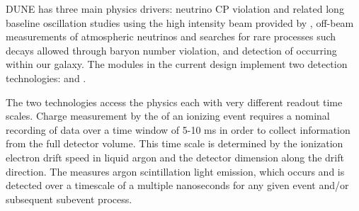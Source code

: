 

\pagebreak



DUNE has three main physics drivers: neutrino CP violation and related
long baseline oscillation studies using the high intensity beam provided
by \fnal, off-beam measurements of atmospheric neutrinos and searches
for rare processes such decays allowed through baryon number violation,
and detection of  occurring within our galaxy.
The   modules in the current design implement two
detection technologies:  and .

The two technologies access the physics each with very different readout
time scales.
Charge measurement by the  of an ionizing event requires a
nominal recording of data over a time window of 5-10 \si{\milli\second}
in order to collect information from the full detector volume. 
This time scale is determined by the ionization electron drift speed in
liquid argon and the detector dimension along the drift direction.
The  measures argon scintillation light emission, which
occurs and is detected over a timescale of a multiple nanoseconds for
any given event and/or subsequent subevent process. 
 
